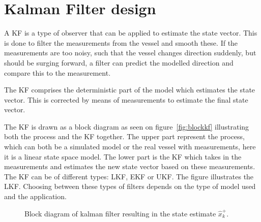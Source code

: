 \section{Kalman Filter design}
\label{sec:kfdesign}

A \ac{KF} is a type of observer that can be applied to estimate the state vector. This is done to filter the measurements from the vessel and smooth these. If the measurements are too noisy, such that the vessel changes direction suddenly, but should be surging forward, a filter can predict the modelled direction and compare this to the measurement.

The \ac{KF} comprises the deterministic part  of the model which estimates the state vector. This is corrected by means of measurements to estimate the final state vector.

The \ac{KF} is drawn as a block diagram as seen on figure~\vref{fig:blockkf} illustrating both the process and the \ac{KF} together. The upper part represent the process, which can both be a simulated model or the real vessel with measurements, here it is a linear state space model. The lower part is the \ac{KF} which takes in the measurements and estimates the new state vector based on these measurements. The \ac{KF} can be of different types: \ac{LKF}, \ac{EKF} or \ac{UKF}. The figure illustrates the \ac{LKF}. Choosing between these types of filters depends on the type of model used and the application. 

\begin{figure}
	\centering
	
	\caption{Block diagram of kalman filter resulting in the state estimate $\hat x_k^+$.}
	\label{fig:blockkf}
\end{figure}


